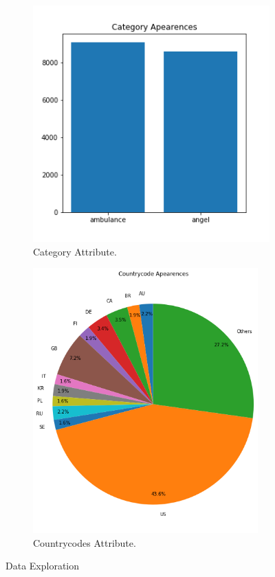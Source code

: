\documentclass{article}
\begin{document}
\begin{figure}[H]
    \centering
    \begin{subfigure}{.45\textwidth}
      \centering
      \includegraphics[width=.95\textwidth]{./img/Category.png}
      \caption{Category Attribute.}
      \label{fig:Category-Attribute}
    \end{subfigure}
    \begin{subfigure}{.45\textwidth}
        \centering
        \includegraphics[width=0.95\textwidth]{./img/Country.png}
        \caption{Countrycodes Attribute.}
        \label{fig:Countrycodes-Attribute}
    \end{subfigure}
    \caption{Data Exploration}
    \label{fig:PCA}
\end{figure}
\end{document}
